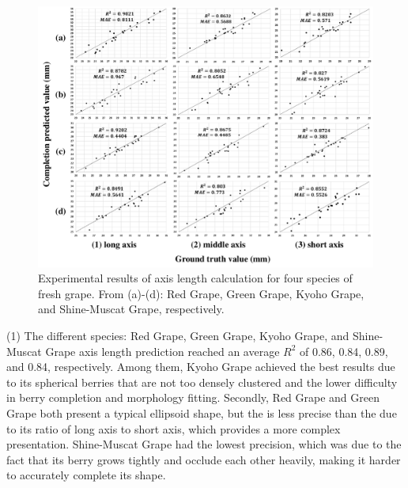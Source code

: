 \documentclass[12pt]{article}
\begin{document}
\begin{figure}[hbt!]
    \centering
    \includegraphics[width=1\textwidth]{figures/Figure14.pdf}
    \caption{Experimental results of axis length calculation for four species of fresh grape. From (a)-(d): Red Grape, Green Grape, Kyoho Grape, and Shine-Muscat Grape, respectively. }
    \label{fig:raw17}
\end{figure}

(1) The different species: Red Grape, Green Grape, Kyoho Grape, and Shine-Muscat Grape axis length prediction reached an average $R^2$ of 0.86, 0.84, 0.89, and 0.84, respectively. 
Among them, Kyoho Grape achieved the best results due to its spherical berries that are not too densely clustered and the lower difficulty in berry completion and morphology fitting. 
Secondly, Red Grape and Green Grape both present a typical ellipsoid shape, but the  is less precise than the  due to its  ratio of long axis to short axis, which provides a more complex presentation. 
Shine-Muscat Grape had the lowest precision, which was due to the fact that its berry grows tightly and occlude each other heavily, making it harder to accurately complete its shape.
\end{document}
